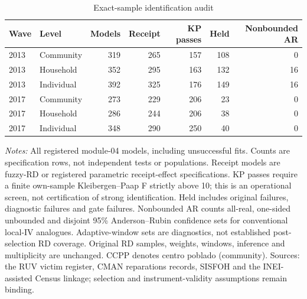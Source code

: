 \begin{table}[!htbp]\centering
\caption{Exact-sample identification audit}\label{tab:exact_sample_audit}
\begin{tabular}{llrrrrr}\toprule
Wave & Level & Models & Receipt & KP passes & Held & Nonbounded AR \\
\midrule
2013 & Community & 319 & 265 & 157 & 108 & 0 \\
2013 & Household & 352 & 295 & 163 & 132 & 16 \\
2013 & Individual & 392 & 325 & 176 & 149 & 16 \\
2017 & Community & 273 & 229 & 206 & 23 & 0 \\
2017 & Household & 286 & 244 & 206 & 38 & 0 \\
2017 & Individual & 348 & 290 & 250 & 40 & 0 \\
\bottomrule\end{tabular}
\begin{minipage}{0.98\linewidth}\footnotesize\textit{Notes:} All registered module-04 models, including unsuccessful fits. Counts are specification rows, not independent tests or populations. Receipt models are fuzzy-RD or registered parametric receipt-effect specifications. KP passes require a finite own-sample Kleibergen--Paap F strictly above 10; this is an operational screen, not certification of strong identification. Held includes original failures, diagnostic failures and gate failures. Nonbounded AR counts all-real, one-sided unbounded and disjoint 95\% Anderson--Rubin confidence sets for conventional local-IV analogues. Adaptive-window sets are diagnostics, not established post-selection RD coverage. Original RD samples, weights, windows, inference and multiplicity are unchanged. CCPP denotes centro poblado (community). Sources: the RUV victim register, CMAN reparations records, SISFOH and the INEI-assisted Census linkage; selection and instrument-validity assumptions remain binding.\end{minipage}\end{table}
